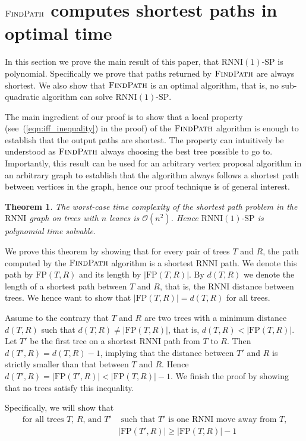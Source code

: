 \documentclass[11pt]{amsart}
\newtheorem{theorem}{Theorem}
\newcommand{\rnni}{\mathrm{RNNI}}
\newcommand{\findpath}{\textsc{FindPath}}
\newcommand{\fp}{\mathrm{FP}}
\newcommand{\decprob}[1]{\rnni(#1)\text{-}\mathrm{SP}}
\renewcommand{\O}{\mathcal O}
\begin{document}
\section{$\findpath$ computes shortest paths in optimal time}

In this section we prove the main result of this paper, that $\decprob{1}$ is polynomial.
Specifically we prove that paths returned by $\findpath$ are always shortest.
We also show that $\findpath$ is an optimal algorithm, that is, no sub-quadratic algorithm can solve $\decprob{1}$.

The main ingredient of our proof is to show that a local property (see~(\ref{eqn:iff_inequality}) in the proof) of the $\findpath$ algorithm is enough to establish that the output paths are shortest.
The property can intuitively be understood as $\findpath$ always choosing the best tree possible to go to.
Importantly, this result can be used for an arbitrary vertex proposal algorithm in an arbitrary graph to establish that the algorithm always follows a shortest path between vertices in the graph, hence our proof technique is of general interest.

\begin{theorem}
The worst-case time complexity of the shortest path problem in the $\rnni$ graph on trees with $n$ leaves is $\O(n^2)$.
Hence $\decprob{1}$ is polynomial time solvable.
\label{thm:rnni_polynomial}
\end{theorem}

\proof
We prove this theorem by showing that for every pair of trees $T$ and $R$, the path computed by the $\findpath$ algorithm is a shortest $\rnni$ path.
We denote this path by $\fp(T, R)$ and its length by $|\fp(T, R)|$.
By $d(T, R)$ we denote the length of a shortest path between $T$ and $R$, that is, the $\rnni$ distance between trees.
We hence want to show that $|\fp(T, R)| = d(T, R)$ for all trees.

Assume to the contrary that $T$ and $R$ are two trees with a minimum distance $d(T, R)$ such that $d(T,R) \neq |\fp(T,R)|$, that is, $d(T,R) < |\fp(T,R)|$.
Let $T'$ be the first tree on a shortest $\rnni$ path from $T$ to $R$.
Then $d(T',R) = d(T, R) - 1$, implying that the distance between $T'$ and $R$ is strictly smaller than that between $T$ and $R$.
Hence $d(T', R) = |\fp(T',R)| < |\fp(T,R)| - 1$.
We finish the proof by showing that no trees satisfy this inequality.

Specifically, we will show that
\begin{equation}
\begin{split}
\mbox{for all trees $T$, $R$, and $T'$}	& \mbox{ such that $T'$ is one $\rnni$ move away from $T$,}\\
					&|\fp(T',R)| \geq |\fp(T,R)| - 1
\end{split}
 \label{eqn:iff_inequality}
\end{equation}
\end{document}
